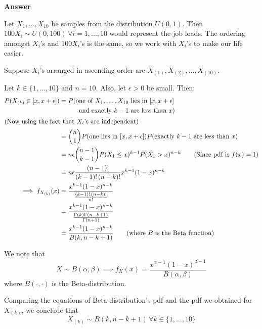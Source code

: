 \documentclass[12pt, oneside]{article}
\begin{document}
\begin{enumerate}
{  \textbf{Answer}

  Let \(X_1, \ldots, X_{10}\) be samples from the distribution \(U(0, 1)\). Then
  \(100X_i \sim U(0, 100) \,\forall i = 1,\ldots,10 \) would represent the job loads.
  The ordering amongst \(X_i\)'s and \(100X_i\)'s is the same, so we work with \(X_i\)'s
  to make our life easier.

  Suppose \(X_i\)'s arranged in ascending order are \(X_{(1)}, X_{(2)}, \ldots, X_{(10)}\).

  Let \(k \in \{1, \ldots, 10\}\) and \(n = 10\). Also, let \(\epsilon > 0\) be small. Then:
  \begin{align*}
    P(X_{(k)} \in [x, x + \epsilon]) &= P(\text{one of \({X_1, \ldots, X_{10}}\) lies in \([x, x + \epsilon]\)} \\
                                     &  \text{~~~~~~~~~and exactly \(k-1\) are less than \(x\)}) \\
      \intertext{(Now using the fact that \(X_i\)'s are independent)}
      &= {n \choose 1} P(\text{one lies in \([x, x + \epsilon]\)}) P(\text{exactly \(k-1\) are less than \(x\)}) \\
      &= n \epsilon {{n - 1} \choose {k - 1}} P(X_1 \leq x)^{k-1} P(X_1 > x)^{n-k} \tag*{(Since pdf is \(f(x) = 1\))} \\
      &= n \epsilon \frac{(n - 1)!}{(k - 1)!\,(n-k)!} x^{k-1} (1-x)^{n-k} \\
    \implies f_{X_{(k)}}(x) &= \frac{ x^{k-1} (1-x)^{n-k}}{\frac{{(k - 1)!\,(n-k)!}}{n!}} \\
      &= \frac{x^{k-1} (1-x)^{n-k}}{\frac{\Gamma(k) \Gamma(n-k+1)}{\Gamma(n+1)}} \\
      &= \frac{x^{k-1} (1-x)^{n-k}}{B(k, n - k + 1)} \tag*{(where \(B\) is the Beta function)}
  \end{align*}

  We note that
  \[X \sim B(\alpha, \beta) \implies f_X(x) = \frac{x^{\alpha - 1}(1-x)^{\beta - 1}}{B(\alpha, \beta)}\]
  where \(B(\cdot, \cdot)\) is the Beta-distribution.

  Comparing the equations of Beta distribution's pdf and the pdf we obtained for \(X_{(k)}\), we
  conclude that \[X_{(k)} \sim B(k, n - k + 1) \,\forall k \in \{1, \ldots, 10\}\]

}
\end{enumerate}
\end{document}
